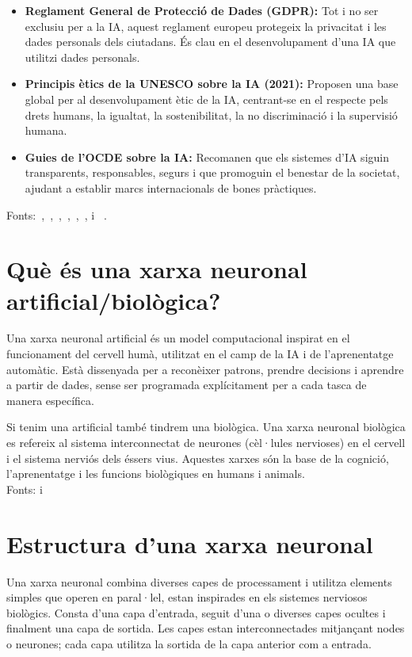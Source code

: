 \begin{enumerate}
\begin{itemize}
        \item \textbf{Reglament General de Protecció de Dades (GDPR): } Tot i no ser exclusiu per a la IA, aquest reglament europeu protegeix la privacitat i les dades personals dels ciutadans. És clau en el desenvolupament d'una IA que utilitzi dades personals.

        \item \textbf{Principis ètics de la UNESCO sobre la IA (2021): } Proposen una base global per al desenvolupament ètic de la IA, centrant-se en el respecte pels drets humans, la igualtat, la sostenibilitat, la no discriminació i la supervisió humana.

        \item \textbf{Guies de l'OCDE sobre la IA: } Recomanen que els sistemes d'IA siguin transparents, responsables, segurs i que promoguin el benestar de la societat, ajudant a establir marcs internacionals de bones pràctiques.

    \end{itemize}
\end{enumerate}

Fonts:~\cite{Universitat_oberta_catalunya},~\cite{Generalitat},~\cite{IBM_machine_learning},~\cite{Ultralytics},~\cite{bengio2012},~\cite{Ai_Act}, \cite{Algoritmes} i ~\cite{Unesco}.

\section{Què és una xarxa neuronal artificial/biològica?}\label{sec:xarxa neuronal}

Una xarxa neuronal artificial és un model computacional inspirat en el funcionament del cervell humà, utilitzat en el camp de la IA i de l'aprenentatge automàtic. Està dissenyada per a reconèixer patrons, prendre decisions i aprendre a partir de dades, sense ser programada explícitament per a cada tasca de manera específica.

Si tenim una artificial també tindrem una biològica. Una xarxa neuronal biològica es refereix al sistema interconnectat de neurones (cèl·lules nervioses) en el cervell i el sistema nerviós dels éssers vius. Aquestes xarxes són la base de la cognició, l'aprenentatge i les funcions biològiques en humans i animals.\\
Fonts: \cite{UOC} i \cite{XarxaBiologica}

\section{Estructura d'una xarxa neuronal}\label{sec:3.6}
Una xarxa neuronal combina diverses capes de processament i utilitza elements simples que operen en paral·lel, estan inspirades en els sistemes nerviosos biològics. Consta d'una capa d'entrada, seguit d'una o diverses capes ocultes i finalment una capa de sortida. Les capes estan interconnectades mitjançant nodes o neurones; cada capa utilitza la sortida de la capa anterior com a entrada.

